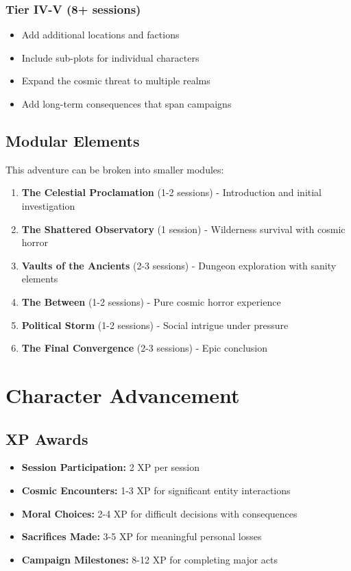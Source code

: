 \documentclass[12pt,twoside]{article}
\begin{document}
\subsubsection{Tier IV-V (8+ sessions)}
\begin{itemize}[leftmargin=*]
\item Add additional locations and factions
\item Include sub-plots for individual characters
\item Expand the cosmic threat to multiple realms
\item Add long-term consequences that span campaigns
\end{itemize}

\subsection{Modular Elements}

This adventure can be broken into smaller modules:

\begin{enumerate}[leftmargin=*]
\item \textbf{The Celestial Proclamation} (1-2 sessions) - Introduction and initial investigation
\item \textbf{The Shattered Observatory} (1 session) - Wilderness survival with cosmic horror
\item \textbf{Vaults of the Ancients} (2-3 sessions) - Dungeon exploration with sanity elements
\item \textbf{The Between} (1-2 sessions) - Pure cosmic horror experience
\item \textbf{Political Storm} (1-2 sessions) - Social intrigue under pressure
\item \textbf{The Final Convergence} (2-3 sessions) - Epic conclusion
\end{enumerate}

\section{Character Advancement}

\subsection{XP Awards}

\begin{itemize}[leftmargin=*]
\item \textbf{Session Participation:} 2 XP per session
\item \textbf{Cosmic Encounters:} 1-3 XP for significant entity interactions
\item \textbf{Moral Choices:} 2-4 XP for difficult decisions with consequences
\item \textbf{Sacrifices Made:} 3-5 XP for meaningful personal losses
\item \textbf{Campaign Milestones:} 8-12 XP for completing major acts
\end{itemize}
\end{document}
